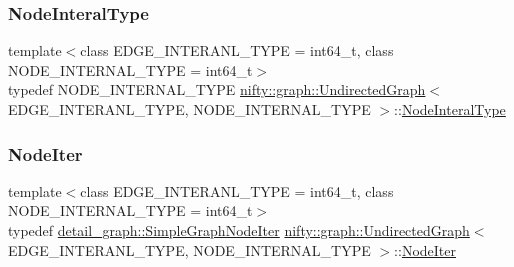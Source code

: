 \mbox{\label{classnifty_1_1graph_1_1UndirectedGraph_aa3b43dd44281416b7232caae529e8780}} 
\subsubsection{\texorpdfstring{Node\+Interal\+Type}{NodeInteralType}}
{\footnotesize\ttfamily template$<$class E\+D\+G\+E\+\_\+\+I\+N\+T\+E\+R\+A\+N\+L\+\_\+\+T\+Y\+PE = int64\+\_\+t, class N\+O\+D\+E\+\_\+\+I\+N\+T\+E\+R\+N\+A\+L\+\_\+\+T\+Y\+PE = int64\+\_\+t$>$ \\
typedef N\+O\+D\+E\+\_\+\+I\+N\+T\+E\+R\+N\+A\+L\+\_\+\+T\+Y\+PE \hyperlink{classnifty_1_1graph_1_1UndirectedGraph}{nifty\+::graph\+::\+Undirected\+Graph}$<$ E\+D\+G\+E\+\_\+\+I\+N\+T\+E\+R\+A\+N\+L\+\_\+\+T\+Y\+PE, N\+O\+D\+E\+\_\+\+I\+N\+T\+E\+R\+N\+A\+L\+\_\+\+T\+Y\+PE $>$\+::\hyperlink{classnifty_1_1graph_1_1UndirectedGraph_aa3b43dd44281416b7232caae529e8780}{Node\+Interal\+Type}\hspace{0.3cm}{\ttfamily [protected]}}

\mbox{\label{classnifty_1_1graph_1_1UndirectedGraph_aac54e4ad3a525489e9b29c1bd4c92c88}} 
\subsubsection{\texorpdfstring{Node\+Iter}{NodeIter}}
{\footnotesize\ttfamily template$<$class E\+D\+G\+E\+\_\+\+I\+N\+T\+E\+R\+A\+N\+L\+\_\+\+T\+Y\+PE = int64\+\_\+t, class N\+O\+D\+E\+\_\+\+I\+N\+T\+E\+R\+N\+A\+L\+\_\+\+T\+Y\+PE = int64\+\_\+t$>$ \\
typedef \hyperlink{classnifty_1_1graph_1_1detail__graph_1_1SimpleGraphNodeIter}{detail\+\_\+graph\+::\+Simple\+Graph\+Node\+Iter} \hyperlink{classnifty_1_1graph_1_1UndirectedGraph}{nifty\+::graph\+::\+Undirected\+Graph}$<$ E\+D\+G\+E\+\_\+\+I\+N\+T\+E\+R\+A\+N\+L\+\_\+\+T\+Y\+PE, N\+O\+D\+E\+\_\+\+I\+N\+T\+E\+R\+N\+A\+L\+\_\+\+T\+Y\+PE $>$\+::\hyperlink{classnifty_1_1graph_1_1UndirectedGraph_aac54e4ad3a525489e9b29c1bd4c92c88}{Node\+Iter}}

